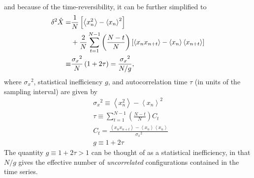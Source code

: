 \begin{appendices}
\begin{align}
\end{align}
and because of the time-reversibility, it can be further simplified to
\begin{align}
	\delta^2 \hat X=& \frac 1N\left[\left<x_n^2\right>-\left<x_n\right>^2\right] \notag\\
	&+\frac 2N\sum\limits_{t=1}^{N-1}\left(\frac{N-t}{N}\right)\left[\left<x_nx_{n+t}\right>-\left<x_n\right>\left<x_{n+t}\right>\right]\notag\\
	\equiv &\frac{{\sigma_x}^2}{N}\left(1+2\tau\right)=\frac{{\sigma_x}^2}{N/g},
\end{align}
where ${\sigma_x}^2$, statistical inefficiency $g$, and autocorrelation time $\tau$ (in units of the sampling interval) are given by
\begin{align}
	&{\sigma_x}^2 \equiv \left<x_n^2\right>-\left<x_n\right>^2\\
	&\tau \equiv \sum\limits_{t=1}^{N-1}\left(\frac{N-t}{N}\right)C_t\\
	&C_t=\frac{\left<x_nx_{n+t}\right>-\left<x_n\right>\left<x_n\right>}{{\sigma_x}^2}\\
	&g\equiv 1+2\tau
\end{align}
The quantity $g\equiv 1+2\tau>1$ can be thought of as a statistical inefficiency, in that $N/g$ gives the effective number of \textit{uncorrelated} configurations contained in the time series.


\end{appendices}
